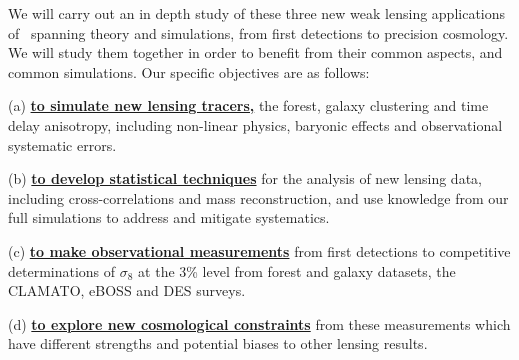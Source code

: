 We will carry out an in depth study of these three new weak lensing
 applications of \atf\, spanning theory and 
simulations, from first detections to precision cosmology. We will study 
them together
 in order to benefit from
their common aspects, and common
simulations. Our specific objectives are as follows:

(a) {\bf \underline{to simulate new lensing tracers,}} the forest, galaxy clustering and time delay anisotropy,
 including non-linear physics, baryonic effects and observational
systematic errors.

(b) {\bf \underline{to develop statistical techniques}} for the analysis of new lensing data, including 
cross-correlations and mass reconstruction, and use knowledge from our full simulations to address and mitigate systematics.

(c) {\bf \underline{to make observational measurements}} from first 
detections to competitive  determinations of $\sigma_{8}$ at the 3\% level 
from forest and galaxy datasets, the CLAMATO, eBOSS and DES surveys.

(d) {\bf \underline{to explore new cosmological constraints}} from these
measurements which have different strengths and potential biases  to other
lensing results.

